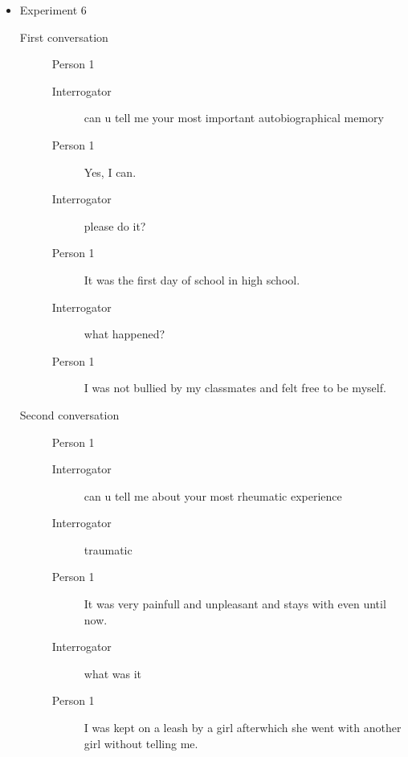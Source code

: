 \begin{itemize}
   \item Experiment 6
      \begin{description}
         \item [First conversation] Person 1
            \begin{description}
               \item [Interrogator] can u tell me your most important autobiographical memory
               \item [Person 1] Yes, I can.
               \item [Interrogator] please do it?
               \item [Person 1] It was the first day of school in high school.
               \item [Interrogator] what happened?
               \item [Person 1] I was not bullied by my classmates and felt free to be myself.
            \end{description}
         \item [Second conversation] Person 1
            \begin{description}
               \item [Interrogator] can u tell me about your most rheumatic experience
               \item [Interrogator] traumatic
               \item [Person 1] It was very painfull and unpleasant and stays with even until now.
               \item [Interrogator] what was it
               \item [Person 1] I was kept on a leash by a girl afterwhich she went with another girl without telling me.
            \end{description}
      \end{description}


\end{itemize}
